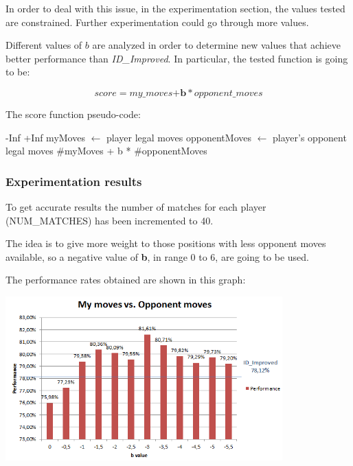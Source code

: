 \documentclass[10pt, a4paper,english]{article}
\begin{document}
In order to deal with this issue, in the experimentation section, the values tested are constrained. Further experimentation could go through more values.

Different values of $b$ are analyzed in order to determine new values that achieve better performance than \textit{ID\_Improved}. In particular, the tested function is going to be:

\[
	score = my\_moves \textbf{+} \textbf{b}*opponent\_moves
\]

The score function pseudo-code:\\

\begin{algorithmic}
    \State\Return -Inf
\EndIf    
{}
   \State \Return +Inf
\Else
	\State myMoves $\leftarrow$ player legal moves
    \State opponentMoves $\leftarrow$ player's opponent legal moves
    \State\Return \#myMoves + b * \#opponentMoves
\EndIf
\EndFunction
\end{algorithmic}

\subsubsection{Experimentation results}

To get accurate results the number of matches for each player (NUM\_MATCHES) has been incremented to 40.   

The idea is to give more weight to those positions with less opponent moves available, so a negative value of \textbf{b}, in range 0 to 6, are going to be used.

The performance rates obtained are shown in this graph:

\begin{center}
\includegraphics[width=0.8\textwidth]{mymovesopponent.png}\\
\end{center}
\end{document}
